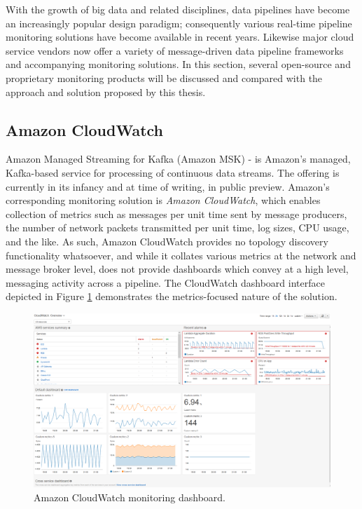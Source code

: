 With the growth of big data and related disciplines, data pipelines have become an increasingly popular design paradigm; consequently various real-time pipeline monitoring solutions have become available in recent years. Likewise major cloud service vendors now offer a variety of message-driven data pipeline frameworks and accompanying monitoring solutions. In this section, several open-source and proprietary monitoring products will be discussed and compared with the approach and solution proposed by this thesis. 

\subsection{Amazon CloudWatch}
Amazon Managed Streaming for Kafka (Amazon MSK) - is Amazon's managed, Kafka-based service for processing of continuous data streams\cite{AmazonMS34:online}. The offering is currently in its infancy and at time of writing, in public preview. Amazon's corresponding monitoring solution is \textit{Amazon CloudWatch}, which enables collection of metrics such as messages per unit time sent by message producers, the number of network packets transmitted per unit time, log sizes, CPU usage, and the like. As such, Amazon CloudWatch provides no topology discovery functionality whatsoever, and while it collates various metrics at the network and message broker level, does not provide dashboards which convey at a high level, messaging activity across a pipeline. The CloudWatch dashboard interface depicted in Figure \ref{cloudwatch_ui} demonstrates the metrics-focused nature of the solution.

\vspace{5mm}

\begin{figure}[H]
	\centering  
	\includegraphics[scale=0.4]{figures/background/cloudwatch.png}
	\caption{Amazon CloudWatch monitoring dashboard.}
	\label{cloudwatch_ui}
\end{figure}

